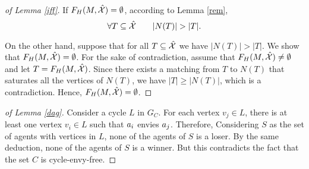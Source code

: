 \begin{proof}[of Lemma \ref{iff}]
If $F_H(M, \hat{\mathcal{X}}) = \emptyset$, according to Lemma \ref{rem}, $$\forall T \subseteq \hat{\mathcal{X}} \qquad |N(T)| > |T|.$$

On the other hand, suppose that for all $T \subseteq \hat{\mathcal{X}}$ we have $|N(T)| > |T|$. We show that $F_H(M, \hat{\mathcal{X}}) = \emptyset$. For the sake of contradiction, assume that $F_H(M, \hat{\mathcal{X}}) \neq \emptyset$ and let $T = F_H(M, \hat{\mathcal{X}})$. Since there exists a matching from $T$ to $N(T)$ that saturates all the vertices of $N(T)$, we have $|T| \geq |N(T)|$, which is a contradiction. Hence, $F_H(M, \hat{\mathcal{X}}) = \emptyset$. 
\end{proof}



\begin{proof}[of Lemma \ref{dag}]
Consider a cycle $L$ in $G_C$. For each vertex $v_j \in L$, there is at least one vertex $v_i \in L$ such that $a_i$ envies $a_j$. Therefore, Considering $S$ as the set of agents with vertices in $L$, none of the agents of $S$ is a loser. By the same deduction, none of the agents of $S$ is a winner. But this contradicts the fact that the set $C$ is cycle-envy-free.
\end{proof}



